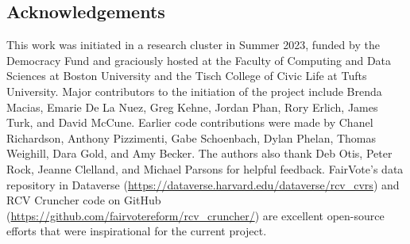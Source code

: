 \documentclass{article}
\begin{document}
\subsection*{Acknowledgements}
This work was initiated in a research cluster in Summer 2023, funded by the Democracy Fund and graciously hosted at the Faculty of Computing and Data Sciences at Boston University and the Tisch College of Civic Life at Tufts University.  Major contributors to the initiation of the project include 
Brenda Macias, Emarie De La Nuez, Greg Kehne, Jordan Phan, Rory Erlich, 
James Turk, and  David McCune.  Earlier code contributions were made by Chanel Richardson, Anthony Pizzimenti, Gabe Schoenbach, Dylan Phelan, Thomas Weighill, Dara Gold, and Amy Becker.
The authors also thank 
Deb Otis, Peter Rock, Jeanne Clelland, and Michael Parsons for helpful feedback.  FairVote's data repository in Dataverse (\url{https://dataverse.harvard.edu/dataverse/rcv_cvrs}) and {\sf RCV Cruncher} code on GitHub (\url{https://github.com/fairvotereform/rcv_cruncher/}) are excellent open-source efforts that were inspirational for the current project.

\clearpage
\printbibliography
\end{document}
